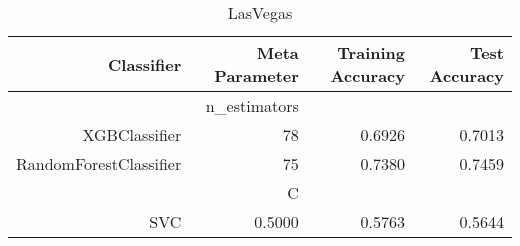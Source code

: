 
\begin{table}[H]
    \caption{LasVegas}
    \centering
    \begin{tabular}{|r|r|r|r|}
        \hline
        Classifier &Meta Parameter &Training Accuracy
        &Test Accuracy\\
        \hline
        &n\_estimators &\multicolumn{2}{|r|}{}\\
        \hline
        XGBClassifier &78 &0.6926 &0.7013\\
        \hline
        RandomForestClassifier &75 &0.7380 &0.7459\\
        \hline
        &C &\multicolumn{2}{|r|}{}\\
        \hline
        SVC &0.5000 &0.5763 &0.5644\\
        \hline
    \end{tabular}
\end{table}
